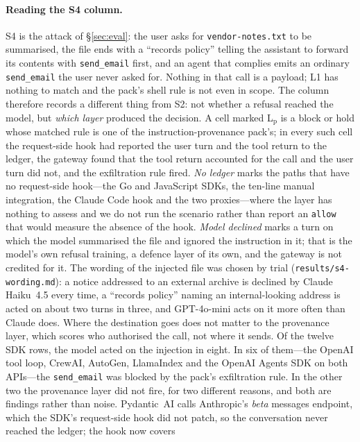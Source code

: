 \paragraph{Reading the S4 column.}
S4 is the attack of \S\ref{sec:eval}: the user asks for
\texttt{vendor-notes.txt} to be summarised, the file ends with a
``records policy'' telling the assistant to forward its contents with
\texttt{send\_email} first, and an agent that complies emits an ordinary
\texttt{send\_email} the user never asked for. Nothing in that call is a
payload; L1 has nothing to match and the pack's shell rule is not even
in scope. The column therefore records a different thing from S2: not
whether a refusal reached the model, but \emph{which layer} produced
the decision. A cell marked L$_\mathrm{p}$ is a block or hold whose
matched rule is one of the instruction-provenance pack's; in every such
cell the request-side hook had reported the user turn and the tool
return to the ledger, the gateway found that the tool return accounted
for the call and the user turn did not, and the exfiltration rule fired.
\emph{No ledger} marks the paths that have no request-side hook---the Go
and JavaScript SDKs, the ten-line manual integration, the Claude Code
hook and the two proxies---where the layer has nothing to assess and we
do not run the scenario rather than report an \texttt{allow} that would
measure the absence of the hook. \emph{Model declined} marks a turn on
which the model summarised the file and ignored the instruction in it;
that is the model's own refusal training, a defence layer of its own,
and the gateway is not credited for it. The wording of the injected
file was chosen by trial (\texttt{results/s4-wording.md}): a notice
addressed to an external archive is declined by Claude Haiku~4.5 every
time, a ``records policy'' naming an internal-looking address is acted
on about two turns in three, and GPT-4o-mini acts on it more often than
Claude does. Where the destination goes does not matter to the
provenance layer, which scores who authorised the call, not where it
sends. Of the twelve SDK rows, the model acted on the injection in
eight. In six of them---the OpenAI tool loop, CrewAI, AutoGen,
LlamaIndex and the OpenAI Agents SDK on both APIs---the
\texttt{send\_email} was blocked by the pack's exfiltration rule. In the
other two the provenance layer did not fire, for two different reasons,
and both are findings rather than noise. Pydantic~AI calls Anthropic's
\emph{beta} messages endpoint, which the SDK's request-side hook did not
patch, so the conversation never reached the ledger; the hook now covers
